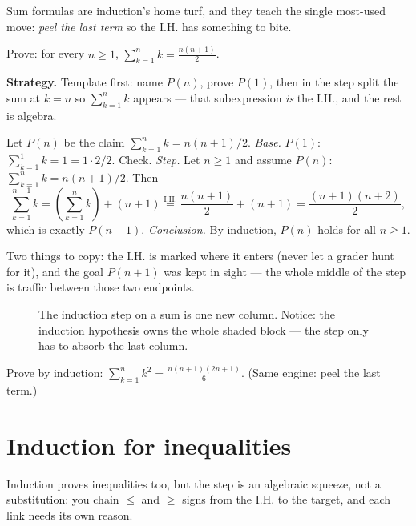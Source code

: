 Sum formulas are induction's home turf, and they teach the single most-used
move: \emph{peel the last term} so the I.H. has something to bite.

\begin{example}\label{ex:gauss}
Prove: for every $n \ge 1$, $\displaystyle\sum_{k=1}^{n} k = \frac{n(n+1)}{2}$.
\par\smallskip
\textbf{Strategy.} Template first: name $P(n)$, prove $P(1)$, then in the step
split the sum at $k=n$ so $\sum_{k=1}^{n} k$ appears --- that subexpression
\emph{is} the I.H., and the rest is algebra.
\par\smallskip
\begin{solution}
Let $P(n)$ be the claim $\sum_{k=1}^{n} k = n(n+1)/2$.
\emph{Base.} $P(1)$: $\sum_{k=1}^{1} k = 1 = 1\cdot 2/2$. Check.
\emph{Step.} Let $n \ge 1$ and assume $P(n)$: $\sum_{k=1}^{n} k = n(n+1)/2$. Then
\[
\sum_{k=1}^{n+1} k = \left(\sum_{k=1}^{n} k\right) + (n+1)
\overset{\text{I.H.}}{=} \frac{n(n+1)}{2} + (n+1)
= \frac{(n+1)(n+2)}{2},
\]
which is exactly $P(n+1)$. \emph{Conclusion.} By induction, $P(n)$ holds for
all $n \ge 1$.
\end{solution}
\end{example}

Two things to copy: the I.H. is marked where it enters (never let a grader hunt
for it), and the goal $P(n+1)$ was kept in sight --- the whole middle of the
step is traffic between those two endpoints.

\begin{figure}[ht]\centering

\caption{The induction step on a sum is one new column. Notice: the
induction hypothesis owns the whole shaded block --- the step only has to
absorb the last column.}
\label{fig:stairsum}
\end{figure}

\begin{exercise}[easy]\label{exr:sumsq}
Prove by induction: $\sum_{k=1}^{n} k^2 = \frac{n(n+1)(2n+1)}{6}$.
(Same engine: peel the last term.)
\end{exercise}

\section{Induction for inequalities}\label{sec:ineqinduct}

Induction proves inequalities too, but the step is an algebraic squeeze, not a
substitution: you chain $\le$ and $\ge$ signs from the I.H. to the target, and
each link needs its own reason.

